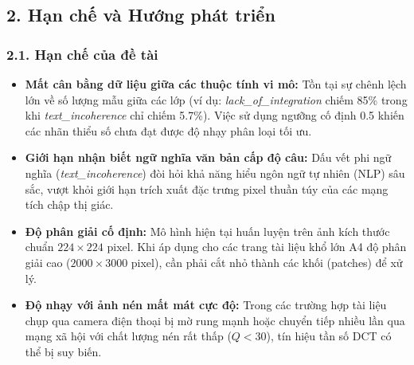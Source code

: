 \subsection{2. Hạn chế và Hướng phát triển}

\subsubsection{2.1. Hạn chế của đề tài}
\begin{itemize}[label={--}, itemsep=2pt]
    \item \textbf{Mất cân bằng dữ liệu giữa các thuộc tính vi mô:} Tồn tại sự chênh lệch lớn về số lượng mẫu giữa các lớp (ví dụ: \textit{lack\_of\_integration} chiếm 85\% trong khi \textit{text\_incoherence} chỉ chiếm 5.7\%). Việc sử dụng ngưỡng cố định 0.5 khiến các nhãn thiểu số chưa đạt được độ nhạy phân loại tối ưu.
    \item \textbf{Giới hạn nhận biết ngữ nghĩa văn bản cấp độ câu:} Dấu vết phi ngữ nghĩa (\textit{text\_incoherence}) đòi hỏi khả năng hiểu ngôn ngữ tự nhiên (NLP) sâu sắc, vượt khỏi giới hạn trích xuất đặc trưng pixel thuần túy của các mạng tích chập thị giác.
    \item \textbf{Độ phân giải cố định:} Mô hình hiện tại huấn luyện trên ảnh kích thước chuẩn $224 \times 224$ pixel. Khi áp dụng cho các trang tài liệu khổ lớn A4 độ phân giải cao ($2000 \times 3000$ pixel), cần phải cắt nhỏ thành các khối (patches) để xử lý.
    \item \textbf{Độ nhạy với ảnh nén mất mát cực độ:} Trong các trường hợp tài liệu chụp qua camera điện thoại bị mờ rung mạnh hoặc chuyển tiếp nhiều lần qua mạng xã hội với chất lượng nén rất thấp ($Q < 30$), tín hiệu tần số DCT có thể bị suy biến.
\end{itemize}

